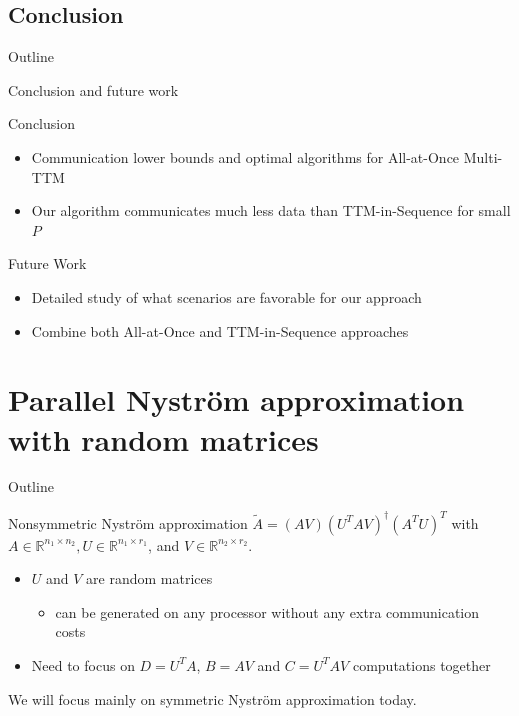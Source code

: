 \documentclass[aspectratio=169]{beamer}
\begin{document}
\subsection{Conclusion}
\begin{frame}{Outline}
	\tableofcontents[currentsubsection]
\end{frame}


\begin{frame}{Conclusion and future work}
	\begin{block}{Conclusion}
		\begin{itemize}
			\item Communication lower bounds and optimal algorithms for All-at-Once Multi-TTM
			\item Our algorithm communicates much less data than TTM-in-Sequence for small $P$
		\end{itemize}
	\end{block}
	\vfill
	\begin{block}{Future Work}
		\begin{itemize}
			\item Detailed study of what scenarios are favorable for our approach
			\item Combine both All-at-Once and TTM-in-Sequence approaches
			
		\end{itemize}
	\end{block}
\end{frame}




	\section{Parallel Nyström approximation with random matrices}
	
	\begin{frame}{Outline}
	\end{frame}
	\begin{frame}{Nonsymmetric Nyström approximation}
	$\tilde{A} = (AV) (U^TAV)^\dagger(A^TU)^T$
	with $A \in \mathbb{R}^{n_1\times n_2}, U \in \mathbb{R}^{n_1\times r_1}$, and $V \in \mathbb{R}^{n_2\times r_2}$.
	\vfill
	\begin{itemize}
		\item $U$ and $V$ are random matrices
		\begin{itemize}
			\item can be generated on any processor without any extra communication costs
		\end{itemize} 
		\vfill
		\item Need to focus on $D=U^TA$, $B=AV$ and $C=U^TAV$ computations together
	\end{itemize}
	\vfill
	\begin{center}
		\alert{We will focus mainly on symmetric Nyström approximation today.}
	\end{center}

	\end{frame}
\end{document}
